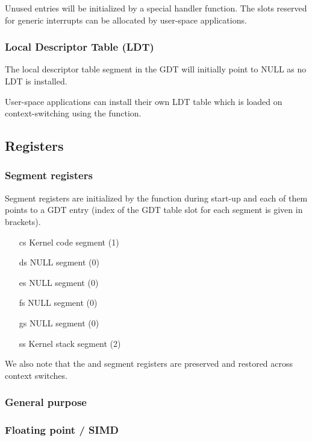 \documentclass[a4paper,11pt,twoside]{report}
\begin{document}
{{Unused entries will be initialized by a special handler function. The slots
reserved for generic interrupts can be allocated by user-space applications.

\subsubsection{Local Descriptor Table (LDT)}

The local descriptor table segment in the GDT will
initially point to NULL as no LDT is installed.

User-space applications can install their own LDT table
which is loaded on context-switching using the
 function.

\subsection{Registers}

\subsubsection{Segment registers}

Segment registers are initialized by the  function during start-up and each of them points to a GDT entry (index of the GDT table slot for each segment is given in brackets).

\begin{itemize}
\item[cs] Kernel code segment (1)
\item[ds] NULL segment (0)
\item[es] NULL segment (0)
\item[fs] NULL segment (0)
\item[gs] NULL segment (0)
\item[ss] Kernel stack segment (2)
\end{itemize}

We also note that the  and  segment registers are
preserved and restored across context switches.

\subsubsection{General purpose}

\subsubsection{Floating point / SIMD}

}}
\end{document}
